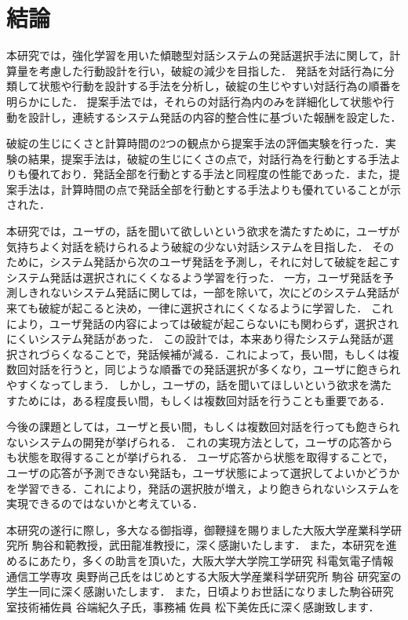 \documentclass[12pt,a4paper,twoside,openany]{jbook}
\begin{document}
\chapter{結論}
本研究では，強化学習を用いた傾聴型対話システムの発話選択手法に関して，計算量を考慮した行動設計を行い，破綻の減少を目指した．
発話を対話行為に分類して状態や行動を設計する手法を分析し，破綻の生じやすい対話行為の順番を明らかにした．
提案手法では，それらの対話行為内のみを詳細化して状態や行動を設計し，連続するシステム発話の内容的整合性に基づいた報酬を設定した．

破綻の生じにくさと計算時間の2つの観点から提案手法の評価実験を行った．実験の結果，提案手法は，破綻の生じにくさの点で，対話行為を行動とする手法よりも優れており．発話全部を行動とする手法と同程度の性能であった．また，提案手法は，計算時間の点で発話全部を行動とする手法よりも優れていることが示された．




本研究では，ユーザの，話を聞いて欲しいという欲求を満たすために，ユーザが気持ちよく対話を続けられるよう破綻の少ない対話システムを目指した．
そのために，システム発話から次のユーザ発話を予測し，それに対して破綻を起こすシステム発話は選択されにくくなるよう学習を行った．
一方，ユーザ発話を予測しきれないシステム発話に関しては，一部を除いて，次にどのシステム発話が来ても破綻が起こると決め，一律に選択されにくくなるように学習した．
これにより，ユーザ発話の内容によっては破綻が起こらないにも関わらず，選択されにくいシステム発話があった．
この設計では，本来あり得たシステム発話が選択されづらくなることで，発話候補が減る．これによって，長い間，もしくは複数回対話を行うと，同じような順番での発話選択が多くなり，ユーザに飽きられやすくなってしまう．
しかし，ユーザの，話を聞いてほしいという欲求を満たすためには，ある程度長い間，もしくは複数回対話を行うことも重要である．

今後の課題としては，ユーザと長い間，もしくは複数回対話を行っても飽きられないシステムの開発が挙げられる．
これの実現方法として，ユーザの応答からも状態を取得することが挙げられる．
ユーザ応答から状態を取得することで，ユーザの応答が予測できない発話も，ユーザ状態によって選択してよいかどうかを学習できる．これにより，発話の選択肢が増え，より飽きられないシステムを実現できるのではないかと考えている．




{


}

\begin{acknowledgement}
本研究の遂行に際し，多大なる御指導，御鞭撻を賜りました大阪大学産業科学研
究所 駒谷和範教授，武田龍准教授に，深く感謝いたします．
また，本研究を進めるにあたり，多くの助言を頂いた，大阪大学大学院工学研究
科電気電子情報通信工学専攻 奥野尚己氏をはじめとする大阪大学産業科学研究所 駒谷
研究室の学生一同に深く感謝いたします．
また，日頃よりお世話になりました駒谷研究室技術補佐員 谷端紀久子氏，事務補
佐員 松下美佐氏に深く感謝致します．
\end{acknowledgement}

\newpage

\appendix
\end{document}
